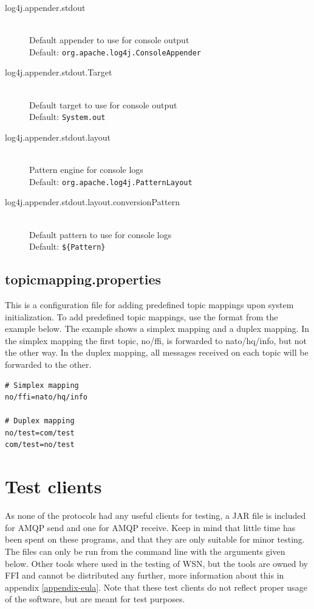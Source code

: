 \begin{description}
 \item[log4j.appender.stdout] \hfill \\
  Default appender to use for console output \hfill \\ Default: \verb!org.apache.log4j.ConsoleAppender!
   \item[log4j.appender.stdout.Target] \hfill \\
  Default target to use for console output \hfill \\ Default: \verb!System.out!
    \item[log4j.appender.stdout.layout] \hfill \\
  Pattern engine for console logs \hfill \\ Default: \verb!org.apache.log4j.PatternLayout!
   \item[log4j.appender.stdout.layout.conversionPattern] \hfill \\
  Default pattern to use for console logs \hfill \\ Default: \verb!${Pattern}!
  
 \end{description}
 
 \subsection{topicmapping.properties}
 \label{subsec:topicmapping.properties}
 
This is a configuration file for adding predefined topic mappings upon system initialization. To add predefined topic mappings, use the format from the example below. The example shows a simplex mapping and a duplex mapping. In the simplex mapping the first topic, no/ffi, is forwarded to nato/hq/info, but not the other way. In the duplex mapping, all messages received on each topic will be forwarded to the other.

\begin{verbatim}
# Simplex mapping
no/ffi=nato/hq/info

# Duplex mapping
no/test=com/test
com/test=no/test
\end{verbatim}
 
\section{Test clients}
\label{sec:test_clients}
As none of the protocols had any useful clients for testing, a JAR file is included for AMQP send and one for AMQP receive. Keep in mind that little time has been spent on these programs, and that they are only suitable for minor testing. The files can only be run from the command line with the arguments given below. Other tools where used in the testing of WSN, but the tools are owned by FFI and cannot be distributed any further, more information about this in appendix \ref{appendix-eula}. Note that these test clients do not reflect proper usage of the software, but are meant for test purposes.

